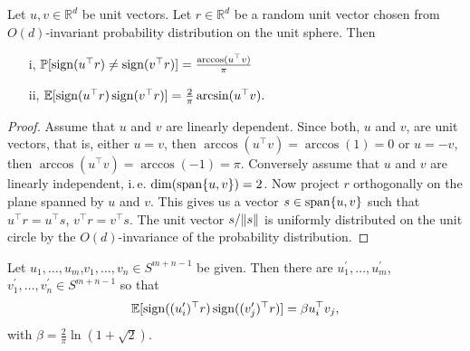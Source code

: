 \begin{lemma}
	Let $u,v\in\mathbb{R}^d$ be unit vectors. Let $r\in\mathbb{R}^d$ be a random unit vector chosen from $O(d)$-invariant probability distribution on the unit sphere. Then
	\begin{enumerate}
		\item[i,] $\mathbb{P}[\operatorname{sign}(u^\top r)\neq\operatorname{sign}(v^\top r)]=\frac{\arccos(u^\top v)}{\pi}$
		\item[ii,] $\mathbb{E}[\operatorname{sign}(u^\top r)\operatorname{sign}(v^\top r)]=\frac{2}{\pi}\arcsin(u^\top v).$
	\end{enumerate}
\end{lemma}
\begin{proof}
	Assume that $u$ and $v$ are linearly dependent. Since both, $u$ and $v$, are unit vectors, that is, either $u=v$, then $\arccos(u^\top v) = \arccos(1)=0$ or $u=-v$, then $\arccos(u^\top v) = \arccos(-1) = \pi$.
	Conversely assume that $u$ and $v$ are linearly independent, i.\,e. $\operatorname{dim}(\operatorname{span}\{u,v\})=2$. Now project $r$ orthogonally on the plane spanned by $u$ and $v$. This gives us a vector $s\in \operatorname{span}\{u,v\}$ such that $u^\top r = u^\top s$, $v^\top r = v^\top s$. The unit vector $s/ \Vert {s} \Vert$ is uniformly distributed on the unit circle by the $O(d)$-invariance of the probability distribution. 
\end{proof}

\begin{lemma}\label{lem:krivines_trick}
	Let $u_1,\dots,u_m$,$v_1,\dots,v_n\in S^{m+n-1}$ be given. Then there are $u_1^\prime,\dots,u_m^\prime$,$v_1^\prime,\dots,v_n^\prime\in S^{m+n-1}$ so that
	\begin{equation}
		\mathbb{E}[\operatorname{sign}((u_i^\prime)^\top r)\operatorname{sign}((v_j^\prime)^\top r)] = \beta u_i^\top v_j,
	\end{equation}		
	with $\beta = \frac{2}{\pi} \ln (1+\sqrt{2}).$
\end{lemma}

